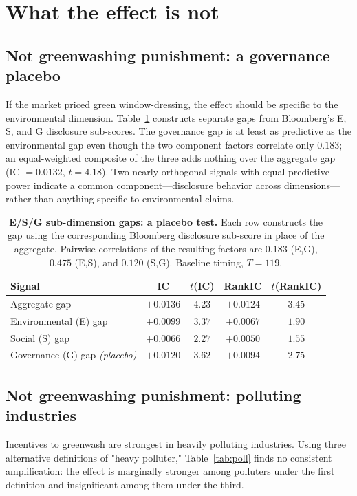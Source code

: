 \documentclass[12pt]{article}
\begin{document}
\section{What the effect is not}

\subsection{Not greenwashing punishment: a governance placebo}
If the market priced green window-dressing, the effect should be specific to
the environmental dimension. Table~\ref{tab:esg} constructs separate gaps from
Bloomberg's E, S, and G disclosure sub-scores. The governance gap is at least
as predictive as the environmental gap even though the two component factors
correlate only $0.183$; an equal-weighted composite of the three adds nothing
over the aggregate gap (IC $=0.0132$, $t=4.18$). Two nearly orthogonal signals
with equal predictive power indicate a common component---disclosure behavior
across dimensions---rather than anything specific to environmental claims.

\begin{table}[t]
\centering\small
\caption{\textbf{E/S/G sub-dimension gaps: a placebo test.} Each row
constructs the gap using the corresponding Bloomberg disclosure sub-score in
place of the aggregate. Pairwise correlations of the resulting factors are
$0.183$ (E,G), $0.475$ (E,S), and $0.120$ (S,G). Baseline timing, $T=119$.}
\label{tab:esg}
\vspace{6pt}
\begin{tabular}{lcccc}
\toprule
Signal & IC & $t$(IC) & RankIC & $t$(RankIC) \\
\midrule
Aggregate gap & $+0.0136$ & $4.23$ & $+0.0124$ & $3.45$ \\
Environmental (E) gap & $+0.0099$ & $3.37$ & $+0.0067$ & $1.90$ \\
Social (S) gap & $+0.0066$ & $2.27$ & $+0.0050$ & $1.55$ \\
Governance (G) gap \emph{(placebo)} & $\mathbf{+0.0120}$ & $\mathbf{3.62}$ & $\mathbf{+0.0094}$ & $\mathbf{2.75}$ \\
\bottomrule
\end{tabular}
\end{table}

\subsection{Not greenwashing punishment: polluting industries}
Incentives to greenwash are strongest in heavily polluting industries. Using
three alternative definitions of "heavy polluter," Table~\ref{tab:poll} finds
no consistent amplification: the effect is marginally stronger among polluters
under the first definition and insignificant among them under the third.
\end{document}

